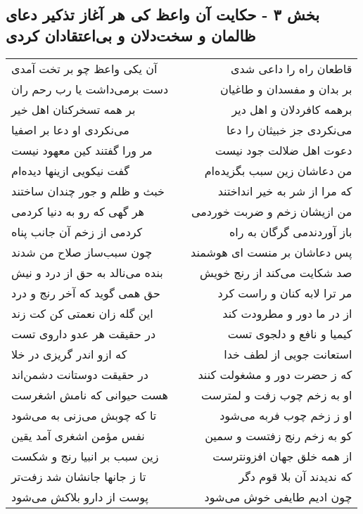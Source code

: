 \begin{center}
\section*{بخش ۳ - حکایت آن واعظ کی هر آغاز تذکیر دعای ظالمان و سخت‌دلان و بی‌اعتقادان کردی}
\label{sec:sh003}
\begin{longtable}{l p{0.5cm} r}
آن یکی واعظ چو بر تخت آمدی
&&
قاطعان راه را داعی شدی
\\
دست برمی‌داشت یا رب رحم ران
&&
بر بدان و مفسدان و طاغیان
\\
بر همه تسخرکنان اهل خیر
&&
برهمه کافردلان و اهل دیر
\\
می‌نکردی او دعا بر اصفیا
&&
می‌نکردی جز خبیثان را دعا
\\
مر ورا گفتند کین معهود نیست
&&
دعوت اهل ضلالت جود نیست
\\
گفت نیکویی ازینها دیده‌ام
&&
من دعاشان زین سبب بگزیده‌ام
\\
خبث و ظلم و جور چندان ساختند
&&
که مرا از شر به خیر انداختند
\\
هر گهی که رو به دنیا کردمی
&&
من ازیشان زخم و ضربت خوردمی
\\
کردمی از زخم آن جانب پناه
&&
باز آوردندمی گرگان به راه
\\
چون سبب‌ساز صلاح من شدند
&&
پس دعاشان بر منست ای هوشمند
\\
بنده می‌نالد به حق از درد و نیش
&&
صد شکایت می‌کند از رنج خویش
\\
حق همی گوید که آخر رنج و درد
&&
مر ترا لابه کنان و راست کرد
\\
این گله زان نعمتی کن کت زند
&&
از در ما دور و مطرودت کند
\\
در حقیقت هر عدو داروی تست
&&
کیمیا و نافع و دلجوی تست
\\
که ازو اندر گریزی در خلا
&&
استعانت جویی از لطف خدا
\\
در حقیقت دوستانت دشمن‌اند
&&
که ز حضرت دور و مشغولت کنند
\\
هست حیوانی که نامش اشغرست
&&
او به زخم چوب زفت و لمترست
\\
تا که چوبش می‌زنی به می‌شود
&&
او ز زخم چوب فربه می‌شود
\\
نفس مؤمن اشغری آمد یقین
&&
کو به زخم رنج زفتست و سمین
\\
زین سبب بر انبیا رنج و شکست
&&
از همه خلق جهان افزونترست
\\
تا ز جانها جانشان شد زفت‌تر
&&
که ندیدند آن بلا قوم دگر
\\
پوست از دارو بلاکش می‌شود
&&
چون ادیم طایفی خوش می‌شود
\\

\end{longtable}
\end{center}
